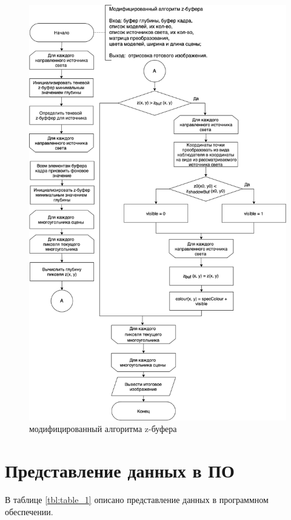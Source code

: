 \documentclass[a4paper,14pt, unknownkeysallowed]{extreport}
\begin{document}
\begin{figure}[h]
	\centering
	\includegraphics[scale=0.5]{img/scheme_4.png}
	\caption{модифицированный алгоритма z-буфера}
	\label{fig:alg2}
\end{figure} 

\clearpage

\section{Представление данных в ПО}

В таблице \ref{tbl:table_1} описано представление данных в программном обеспечении.
\end{document}
